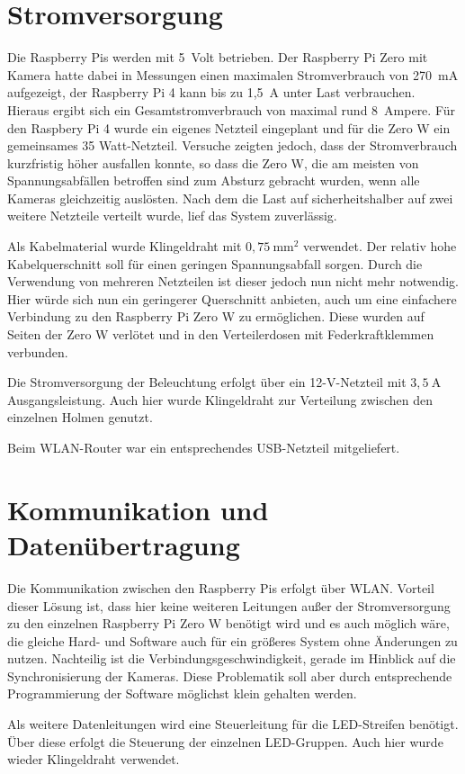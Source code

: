 \documentclass[./00_PhotoBox.tex]{subfiles}
\begin{document}
\section{Stromversorgung}
Die Raspberry Pis werden mit 5~Volt betrieben. Der Raspberry Pi Zero mit Kamera hatte dabei in Messungen einen maximalen Stromverbrauch von 270~mA aufgezeigt, der Raspberry Pi 4 kann bis zu 1,5~A unter Last verbrauchen. Hieraus ergibt sich ein Gesamtstromverbrauch von maximal rund 8~Ampere. Für den Raspbery Pi 4 wurde ein eigenes Netzteil eingeplant und für die Zero W ein gemeinsames 35 Watt-Netzteil. Versuche zeigten jedoch, dass der Stromverbrauch kurzfristig höher ausfallen konnte, so dass die Zero W, die am meisten von Spannungsabfällen betroffen sind zum Absturz gebracht wurden, wenn alle Kameras gleichzeitig auslösten. Nach dem die Last auf sicherheitshalber auf zwei weitere Netzteile verteilt wurde, lief das System zuverlässig.

Als Kabelmaterial wurde Klingeldraht mit $0,75~\text{mm}^2$ verwendet. Der relativ hohe Kabelquerschnitt soll für einen geringen Spannungsabfall sorgen. Durch die Verwendung von mehreren Netzteilen ist dieser jedoch nun nicht mehr notwendig. Hier würde sich nun ein geringerer Querschnitt anbieten, auch um eine einfachere Verbindung zu den Raspberry Pi Zero W zu ermöglichen. Diese wurden auf Seiten der Zero W verlötet und in den Verteilerdosen mit Federkraftklemmen verbunden.

Die Stromversorgung der Beleuchtung erfolgt über ein 12-V-Netzteil mit $3,5~\text{A}$ Ausgangsleistung. Auch hier wurde Klingeldraht zur Verteilung zwischen den einzelnen Holmen genutzt.

Beim WLAN-Router war ein entsprechendes USB-Netzteil mitgeliefert.

\section{Kommunikation und Datenübertragung}
Die Kommunikation zwischen den Raspberry Pis erfolgt über WLAN. Vorteil dieser Lösung ist, dass hier keine weiteren Leitungen außer der Stromversorgung zu den einzelnen Raspberry Pi Zero W benötigt wird und es auch möglich wäre, die gleiche Hard- und Software auch für ein größeres System ohne Änderungen zu nutzen. Nachteilig ist die Verbindungsgeschwindigkeit, gerade im Hinblick auf die Synchronisierung der Kameras. Diese Problematik soll aber durch entsprechende Programmierung der Software möglichst klein gehalten werden.

Als weitere Datenleitungen wird eine Steuerleitung für die LED-Streifen benötigt. Über diese erfolgt die Steuerung der einzelnen LED-Gruppen. Auch hier wurde wieder Klingeldraht verwendet.

\biblio
\end{document}
